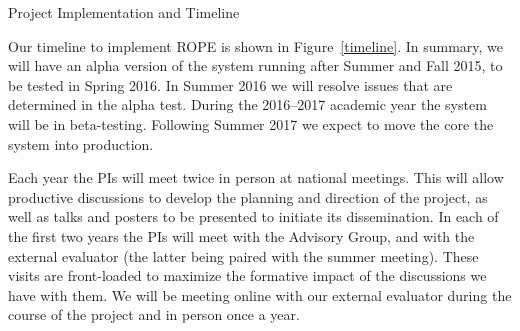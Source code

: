 \documentclass[11pt]{article}
\begin{document}
\begin{section}{Project Implementation and Timeline}

Our timeline to implement ROPE is shown in Figure~\ref{timeline}.  In
summary, we will have an alpha version of the system running after Summer
and Fall 2015, to be tested in Spring 2016.  In Summer 2016 we will
resolve issues that are determined in the alpha test.  During the
2016--2017 academic year the system will be in beta-testing.  Following
Summer 2017 we expect to move the core the system into production.

Each year the PIs will meet twice in person at national meetings.  This
will allow productive discussions to develop the planning and
direction of the project, as well as talks and posters to be presented to
initiate its dissemination.  In each of the first two years the PIs will
meet with the 
Advisory Group, and with the external evaluator (the latter being paired
with the summer meeting).  These visits are front-loaded to maximize the
formative impact of the discussions we have with them.  We
will be meeting online with our external evaluator during the course of the
project and in person once a year.


\end{section}
\end{document}
